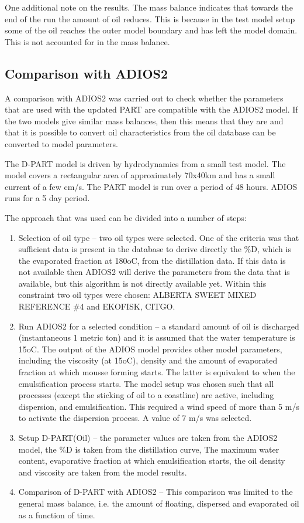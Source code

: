 \documentclass[english]{deltares_manual}
\begin{document}
One additional note on the results. The mass balance indicates that towards the end of the run the amount of oil reduces. This is because in the test model setup some of the oil reaches the outer model boundary and has left the model domain. This is not accounted for in the mass balance. 

\subsection{Comparison with ADIOS2}
A comparison with ADIOS2 was carried out to check whether the parameters that are used with the updated PART are compatible with the ADIOS2 model. If the two models give similar mass balances, then this means that they are and that it is possible to convert oil characteristics from the oil database can be converted to model parameters. 

The D-PART model is driven by hydrodynamics from a small test model. The model covers a rectangular area of approximately 70x40km and has a small current of a few cm/s. The PART model is run over a period of 48 hours.  ADIOS runs for a 5 day period.

The approach that was used can be divided into a number of steps:
\begin{enumerate}
	\item Selection of oil type – two oil types were selected. One of the criteria was that sufficient data is present in the database to derive directly the \%D, which is the evaporated fraction at 180oC, from the distillation data. If this data is not available then ADIOS2 will derive the parameters from the data that is available, but this algorithm is not directly available yet. Within this constraint two oil types were chosen: ALBERTA SWEET MIXED REFERENCE \#4 and EKOFISK, CITGO.
	\item Run ADIOS2 for a selected condition – a standard amount of oil is discharged (instantaneous 1 metric ton) and it is assumed that the water temperature is 15oC. The output of the ADIOS model provides other model parameters, including the viscosity (at 15oC), density and the amount of evaporated fraction at which mousse forming starts. The latter is equivalent to when the emulsification process starts. The model setup was chosen such that all processes (except the sticking of oil to a coastline) are active, including dispersion, and emulsification. This required a wind speed of more than 5 m/s to activate the dispersion process. A value of 7 m/s was selected. 
	\item Setup D-PART(Oil) – the parameter values are taken from the ADIOS2 model, the \%D is taken from the distillation curve, The maximum water content, evaporative fraction at which emulsification starts, the oil density and viscosity are taken from the model results. 
	\item Comparison of D-PART with ADIOS2 – This comparison was limited to the general mass balance, i.e. the amount of floating, dispersed and evaporated oil as a function of time. 
	
\end{enumerate}
\end{document}
